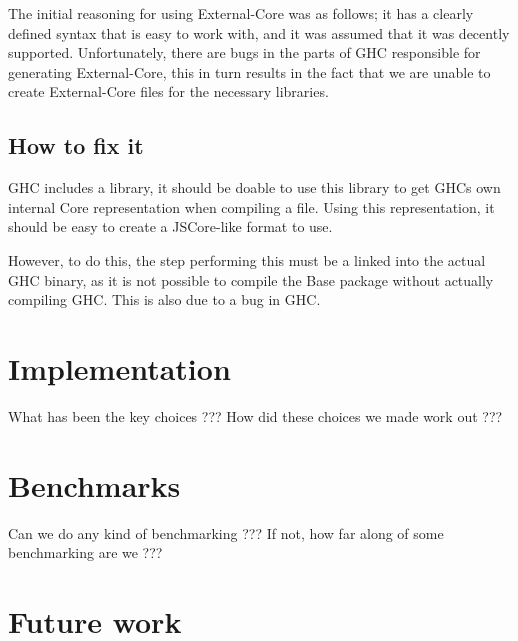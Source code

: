 The initial reasoning for using External-Core was as follows;
it has a clearly defined syntax that is easy to work with, and it was 
assumed that it was decently supported. Unfortunately, there are bugs in
the parts of GHC responsible for generating External-Core, this in turn
results in the fact that we are unable to create External-Core files for the
necessary libraries.


\subsection{How to fix it}


GHC includes a library, it should be doable to use this library to get
GHCs own internal Core representation when compiling a file. Using this 
representation, it should be easy to create a JSCore-like format to use.

However, to do this, the step performing this must be a linked into the
actual GHC binary, as it is not possible to compile the Base package without
actually compiling GHC. This is also due to a bug in GHC.













\section{Implementation}

What has been the key choices ??? How did these choices we made work out ???

\section{Benchmarks}

Can we do any kind of benchmarking ??? If not, how far along of some 
benchmarking are we ???

\section{Future work}

